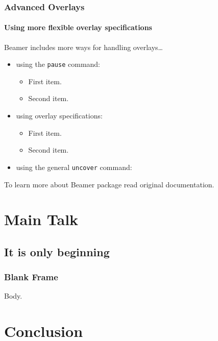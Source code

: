 \documentclass{beamer}
\begin{document}
\begin{frame}
  \frametitle{Advanced Overlays}
  \framesubtitle{Using more flexible overlay specifications}

  Beamer includes more ways for handling 
  overlays\dots
  \begin{itemize}
  \item using the \texttt{pause} command:
    \begin{itemize}
    \item
      First item.
      \pause
    \item    
      Second item.
    \end{itemize}
  \item
    using overlay specifications:
    \begin{itemize}
    \item<3->
      First item.
    \item<4->
      Second item.
    \end{itemize}
  \item
    using the general \texttt{uncover} command:
    \begin{itemize}
    \end{itemize}
  \end{itemize}

  To learn more about Beamer package 
  read original documentation.

\end{frame}

\section{Main Talk}

\subsection{It is only beginning}

\begin{frame}
  \frametitle{Blank Frame}
  Body.
\end{frame}

\section*{Conclusion}
\end{document}
